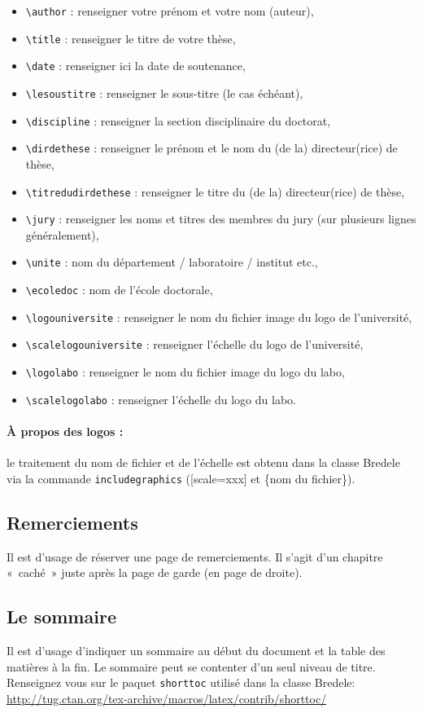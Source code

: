 \documentclass[10pt,a4paper]{article}
\begin{document}
\begin{itemize}
\item \verb!\author! : renseigner votre prénom et votre nom (auteur),
\item \verb!\title! : renseigner le titre de votre thèse,
\item \verb!\date! : renseigner ici la date de soutenance,
\item \verb!\lesoustitre! : renseigner le sous-titre (le cas échéant),
\item \verb!\discipline! : renseigner la section disciplinaire du doctorat,
\item \verb!\dirdethese! : renseigner le prénom et le nom du (de la) directeur(rice) de thèse,
\item \verb!\titredudirdethese! : renseigner le titre du (de la) directeur(rice) de thèse,
\item \verb!\jury! : renseigner les noms et titres des membres du jury (sur plusieurs lignes généralement),
\item \verb!\unite! : nom du département / laboratoire / institut etc.,
\item \verb!\ecoledoc! : nom de l'école doctorale,
\item \verb!\logouniversite! : renseigner le nom du fichier image du logo de l'université,
\item \verb!\scalelogouniversite! : renseigner l'échelle du logo de l'université,
\item \verb!\logolabo! : renseigner le nom du fichier image du logo du labo,
\item \verb!\scalelogolabo! : renseigner l'échelle du logo du labo.
\end{itemize} 

\paragraph{À propos des logos :}  le traitement du nom de fichier et de l'échelle est obtenu dans la classe Bredele via la commande \verb!includegraphics! ([scale=xxx] et \{nom du fichier\}).

\subsection{Remerciements}
Il est d'usage de réserver une page de remerciements. Il s'agit d'un chapitre «~caché~» juste après la page de garde (en page de droite).

\subsection{Le sommaire}
Il est d'usage d'indiquer un sommaire au début du document et la table des matières à la fin. Le sommaire peut se contenter d'un seul niveau de titre. Renseignez vous sur le paquet \verb!shorttoc! utilisé dans la classe Bredele: \url{http://tug.ctan.org/tex-archive/macros/latex/contrib/shorttoc/}
\end{document}
